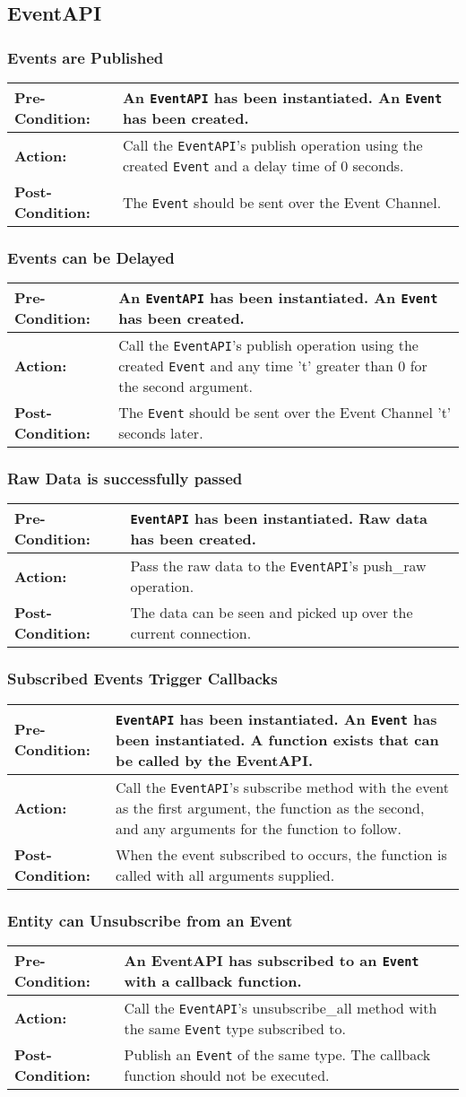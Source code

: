 \documentclass[titlepage]{article}
\newcommand{\testcase}[3]{
    \begin{center}
    \begin{tabular}{| l | p{0.7\textwidth}|}
        \hline
        \rowcolor[gray]{0.8}\textbf{Pre-Condition:} & #1 \\ \hline
        \textbf{Action:} & #2 \\ \hline
        \rowcolor[gray]{0.8}\textbf{Post-Condition:} & #3 \\ \hline
    \end{tabular}
    \end{center}
}
\begin{document}
\subsection{EventAPI}
\subsubsection{Events are Published}
\testcase{An \texttt{EventAPI} has been instantiated. An \texttt{Event} has been created.}{Call the \texttt{EventAPI}'s publish operation using the created \texttt{Event} and a delay time of 0 seconds.}{The \texttt{Event} should be sent over the Event Channel.}

\subsubsection{Events can be Delayed}
\testcase{An \texttt{EventAPI} has been instantiated. An \texttt{Event} has been created.}{Call the \texttt{EventAPI}'s publish operation using the created \texttt{Event} and any time 't' greater than 0 for the second argument.}{The \texttt{Event} should be sent over the Event Channel 't' seconds later.}

\subsubsection{Raw Data is successfully passed}
\testcase{\texttt{EventAPI} has been instantiated. Raw data has been created.}{Pass the raw data to the \texttt{EventAPI}'s push\_raw operation.}{The data can be seen and picked up over the current connection.}


\subsubsection{Subscribed Events Trigger Callbacks}
\testcase{\texttt{EventAPI} has been instantiated.  An \texttt{Event} has been instantiated. A function exists that can be called by the EventAPI.}{Call the \texttt{EventAPI}'s subscribe method with the event as the first argument, the function as the second, and any arguments for the function to follow.}{When the event subscribed to occurs, the function is called with all arguments supplied. }

\subsubsection{Entity can Unsubscribe from an Event}
\testcase{An EventAPI has subscribed to an \texttt{Event} with a callback function.}{Call the \texttt{EventAPI}'s unsubscribe\_all method with the same \texttt{Event} type subscribed to.}{Publish an \texttt{Event} of the same type. The callback function should not be executed.}
\end{document}
